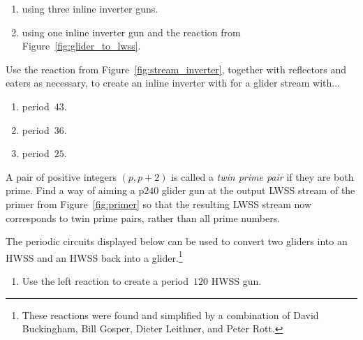 \begin{multicols}{2}
\begin{problem}
		\begin{enumerate}[label=\bf\color{ocre}(\alph*)]
			\item using three inline inverter guns.
			
			\item using one inline inverter gun and the reaction from Figure~\ref{fig:glider_to_lwss}.
		\end{enumerate}
	\end{problem}
	
	
	\mfilbreak
	
	
	\begin{problem}\label{exer:make_inline_inverter_with_weird_period}
		Use the reaction from Figure~\ref{fig:stream_inverter}, together with reflectors and eaters as necessary, to create an inline inverter with for a glider stream with...\smallskip
		
		\begin{enumerate}[label=\bf\color{ocre}(\alph*)]
			\item period~$43$.
			
			\item period~$36$.
			
			\item period~$25$.
		\end{enumerate}
	\end{problem}
	
	
	\mfilbreak
	
	
	\begin{problem}\label{exer:twin_prime_gun}
		A pair of positive integers $(p,p+2)$ is called a \emph{twin prime pair} if they are both prime. Find a way of aiming a p$240$ glider gun at the output LWSS stream of the primer from Figure~\ref{fig:primer} so that the resulting LWSS stream now corresponds to twin prime pairs, rather than all prime numbers.
		
	\end{problem}
	
	
	\mfilbreak
	
	
	\begin{problem}\label{exer:glider_to_hwss_to_glider}
		The periodic circuits displayed below can be used to convert two gliders into an HWSS and an HWSS back into a glider.\footnote{These reactions were found and simplified by a combination of David Buckingham, Bill Gosper, Dieter Leithner, and Peter Rott.}
		\begin{center}
		\end{center}
		\begin{enumerate}[label=\bf\color{ocre}(\alph*)]
			\item Use the left reaction to create a period~$120$ HWSS gun.
			

\end{enumerate}
\end{problem}
\end{multicols}
